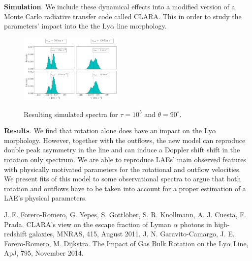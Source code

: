 \documentclass[preprint,proceedings]{rmaa}
\begin{document}
{\bf Simulation}.
We include these dynamical effects into a modified version of a Monte Carlo radiative transfer code
called CLARA. This in order to study the parameters' impact into the the Ly$\alpha$ line morphology.

\begin{figure}[h!]
	\centering
	\includegraphics[width=0.45\textwidth]{spectra}
	\label{fig1}
	\caption{Resulting simulated spectra for $\tau=10^5$ and $\theta=90^\circ$.}
\end{figure}

{\bf Results}. We find that rotation alone does have an impact on the Ly$\alpha$ morphology. 
However, together with the outflows, the new model can reproduce double peak asymmetry in the line 
and can induce a Doppler shift shift in the rotation only spectrum. We are able to reproduce LAEs' main
observed features with physically motivated parameters for the rotational and outflow velocities.
We present fits of this model to some observational spectra to argue that both rotation and outflows
have to be taken into account for a proper estimation of a LAE's physical parameters. 


\begin{thebibliography}

 J. E. {Forero-Romero}, G. {Yepes}, S. {Gottl{\"o}ber}, S. R. {Knollmann},
			A. J. {Cuesta}, F. {Prada}.
  			{CLARA's view on the escape fraction of Lyman {$\alpha$} photons in high-redshift galaxies},
  			MNRAS, 415, August 2011.
 J. N. {Garavito-Camargo}, J. E. {Forero-Romero}, M. {Dijkstra}.
			{The Impact of Gas Bulk Rotation on the Ly{$\alpha$} Line},
			ApJ, 795, November 2014.

\end{thebibliography} 
\end{document}
